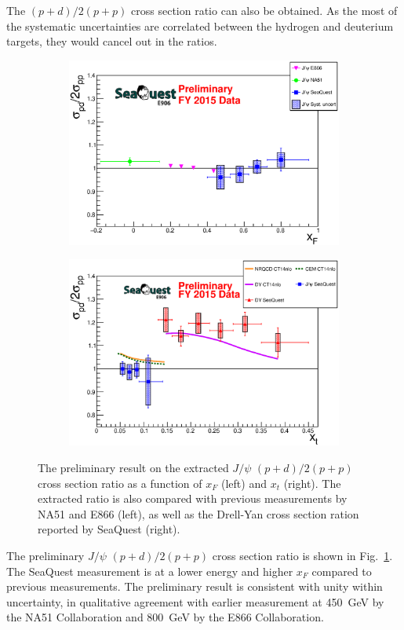 \documentclass[10pt, a4paper,final]{article}
\begin{document}
The $(p+d)/2(p+p)$ cross section ratio can also be obtained. As the most of the
systematic uncertainties are correlated between the hydrogen and deuterium targets,
they would cancel out in the ratios.
\begin{figure}[htbp!]
	\centering
	\begin{subfigure}{0.45\linewidth}
		\includegraphics[width=0.9\linewidth]{jPsi_all_noTheory_v2}
	\end{subfigure}
	\begin{subfigure}{0.45\linewidth}
		\includegraphics[width=0.9\linewidth]{jPsi_csr_x2_nature_NRQCD_CEM}
	\end{subfigure}
	\caption{The preliminary result on the extracted $J/\psi$ $(p+d)/2(p+p)$
		cross section ratio as a function of $x_F$ (left) and $x_t$ (right).
		The extracted ratio is also compared with previous measurements by NA51
		\cite{abreu1998} and E866 \cite{peng2003} (left), as well as the Drell-Yan
		cross section ration reported by SeaQuest\cite{dove2021} (right).}
	\label{fig:csr}
\end{figure}
The preliminary $J/\psi$ $(p+d)/2(p+p)$ cross section ratio is shown in
Fig.~\ref{fig:csr}. The SeaQuest measurement is at a lower energy and higher $x_F$
compared to previous measurements. The preliminary result is consistent with unity
within uncertainty, in qualitative agreement with earlier measurement at \SI{450}{\GeV}
by the NA51 Collaboration and \SI{800}{\GeV} by the E866 Collaboration.
\end{document}

